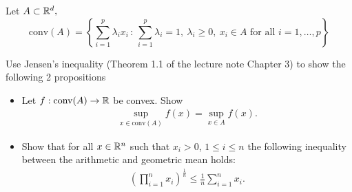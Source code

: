 \documentclass{ExerciseSheet}
\begin{document}
\vskip 0.5cm
\begin{exo}

 Let $A\subset \mathbb{R}^d,$ $$\text{conv}(A)=\left\{\displaystyle\sum_{i=1}^p\lambda_i x_i\,:\,\displaystyle\sum_{i=1}^p\lambda_i=1,~\lambda_i\geq 0,~ x_i \in A\text{ for all } i=1,\ldots,p\right\}$$

\item Use Jensen's inequality (Theorem 1.1 of the lecture note Chapter 3) to show the following 2 propositions
\begin{itemize}
    \item Let $f:\text{conv}(A)\rightarrow \mathbb{R}$ be convex. Show 
    \begin{align*}
     \sup_{x \in \text{conv}(A)} f(x)=\sup_{x\in A} f(x). 
    \end{align*}

    \item Show that for all $x\in \mathbb{R}^n$ such that $x_i >0$, $1\leq i\leq n$ the following inequality between the arithmetic and geometric mean holds:
	\begin{align*}
	\left( \prod_{i=1}^n x_i \right)^{\frac{1}{n}} \leq \frac{1}{n} \sum_{i=1}^n x_i.
	\end{align*}
 \end{itemize}


\end{exo}
\end{document}
